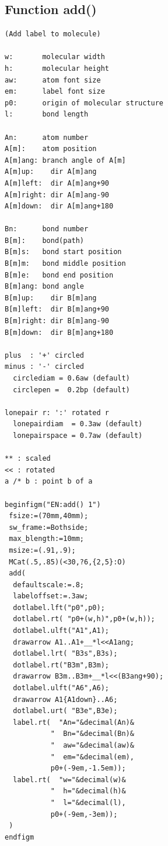 \documentclass[a4paper]{article}
\begin{document}
\subsection{Function add()}
%
%
%
%
%
%
%
%
%
%
%
%
%
%
\index{/*}%
\index{**}%
\index{\textgreater\textgreater}%
%
%
%
%
%
%
%
%
%
%
%
%
%
%
%
%
%
%
%
\begin{verbatim}
(Add label to molecule)

w:       molecular width
h:       molecular height
aw:      atom font size
em:      label font size
p0:      origin of molecular structure
l:       bond length

An:      atom number
A[m]:    atom position
A[m]ang: branch angle of A[m]
A[m]up:    dir A[m]ang
A[m]left:  dir A[m]ang+90
A[m]right: dir A[m]ang-90
A[m]down:  dir A[m]ang+180

Bn:      bond number
B[m]:    bond(path)
B[m]s:   bond start position
B[m]m:   bond middle position
B[m]e:   bond end position
B[m]ang: bond angle
B[m]up:    dir B[m]ang
B[m]left:  dir B[m]ang+90
B[m]right: dir B[m]ang-90
B[m]down:  dir B[m]ang+180

plus  : '+' circled
minus : '-' circled
  circlediam = 0.6aw (default)
  circlepen =  0.2bp (default)

lonepair r: ':' rotated r
  lonepairdiam  = 0.3aw (default)
  lonepairspace = 0.7aw (default)

** : scaled
<< : rotated
a /* b : point b of a

beginfigm("EN:add() 1")
 fsize:=(70mm,40mm);
 sw_frame:=Bothside;
 max_blength:=10mm;
 msize:=(.91,.9);
 MCat(.5,.85)(<30,?6,{2,5}:O)
 add(
  defaultscale:=.8;
  labeloffset:=.3aw;
  dotlabel.lft("p0",p0);
  dotlabel.rt( "p0+(w,h)",p0+(w,h));
  dotlabel.ulft("A1",A1);
  drawarrow A1..A1+__*l<<A1ang;
  dotlabel.lrt( "B3s",B3s);
  dotlabel.rt("B3m",B3m);
  drawarrow B3m..B3m+__*l<<(B3ang+90);
  dotlabel.ulft("A6",A6);
  drawarrow A1{A1down}..A6;
  dotlabel.urt( "B3e",B3e);
  label.rt(  "An="&decimal(An)&
           "  Bn="&decimal(Bn)&
           "  aw="&decimal(aw)&
           "  em="&decimal(em),
           p0+(-9em,-1.5em));
  label.rt(  "w="&decimal(w)&
           "  h="&decimal(h)&
           "  l="&decimal(l),
           p0+(-9em,-3em));
 )
endfigm
\end{verbatim}
\end{document}
